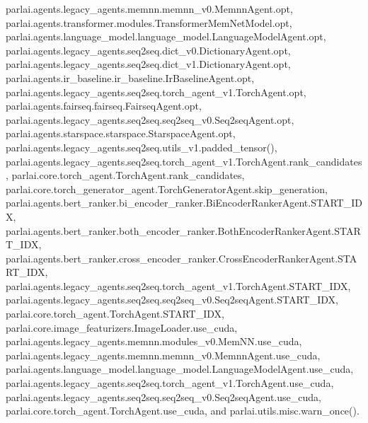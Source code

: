 parlai.\+agents.\+legacy\+\_\+agents.\+memnn.\+memnn\+\_\+v0.\+Memnn\+Agent.\+opt, parlai.\+agents.\+transformer.\+modules.\+Transformer\+Mem\+Net\+Model.\+opt, parlai.\+agents.\+language\+\_\+model.\+language\+\_\+model.\+Language\+Model\+Agent.\+opt, parlai.\+agents.\+legacy\+\_\+agents.\+seq2seq.\+dict\+\_\+v0.\+Dictionary\+Agent.\+opt, parlai.\+agents.\+legacy\+\_\+agents.\+seq2seq.\+dict\+\_\+v1.\+Dictionary\+Agent.\+opt, parlai.\+agents.\+ir\+\_\+baseline.\+ir\+\_\+baseline.\+Ir\+Baseline\+Agent.\+opt, parlai.\+agents.\+legacy\+\_\+agents.\+seq2seq.\+torch\+\_\+agent\+\_\+v1.\+Torch\+Agent.\+opt, parlai.\+agents.\+fairseq.\+fairseq.\+Fairseq\+Agent.\+opt, parlai.\+agents.\+legacy\+\_\+agents.\+seq2seq.\+seq2seq\+\_\+v0.\+Seq2seq\+Agent.\+opt, parlai.\+agents.\+starspace.\+starspace.\+Starspace\+Agent.\+opt, parlai.\+agents.\+legacy\+\_\+agents.\+seq2seq.\+utils\+\_\+v1.\+padded\+\_\+tensor(), parlai.\+agents.\+legacy\+\_\+agents.\+seq2seq.\+torch\+\_\+agent\+\_\+v1.\+Torch\+Agent.\+rank\+\_\+candidates, parlai.\+core.\+torch\+\_\+agent.\+Torch\+Agent.\+rank\+\_\+candidates, parlai.\+core.\+torch\+\_\+generator\+\_\+agent.\+Torch\+Generator\+Agent.\+skip\+\_\+generation, parlai.\+agents.\+bert\+\_\+ranker.\+bi\+\_\+encoder\+\_\+ranker.\+Bi\+Encoder\+Ranker\+Agent.\+S\+T\+A\+R\+T\+\_\+\+I\+DX, parlai.\+agents.\+bert\+\_\+ranker.\+both\+\_\+encoder\+\_\+ranker.\+Both\+Encoder\+Ranker\+Agent.\+S\+T\+A\+R\+T\+\_\+\+I\+DX, parlai.\+agents.\+bert\+\_\+ranker.\+cross\+\_\+encoder\+\_\+ranker.\+Cross\+Encoder\+Ranker\+Agent.\+S\+T\+A\+R\+T\+\_\+\+I\+DX, parlai.\+agents.\+legacy\+\_\+agents.\+seq2seq.\+torch\+\_\+agent\+\_\+v1.\+Torch\+Agent.\+S\+T\+A\+R\+T\+\_\+\+I\+DX, parlai.\+agents.\+legacy\+\_\+agents.\+seq2seq.\+seq2seq\+\_\+v0.\+Seq2seq\+Agent.\+S\+T\+A\+R\+T\+\_\+\+I\+DX, parlai.\+core.\+torch\+\_\+agent.\+Torch\+Agent.\+S\+T\+A\+R\+T\+\_\+\+I\+DX, parlai.\+core.\+image\+\_\+featurizers.\+Image\+Loader.\+use\+\_\+cuda, parlai.\+agents.\+legacy\+\_\+agents.\+memnn.\+modules\+\_\+v0.\+Mem\+N\+N.\+use\+\_\+cuda, parlai.\+agents.\+legacy\+\_\+agents.\+memnn.\+memnn\+\_\+v0.\+Memnn\+Agent.\+use\+\_\+cuda, parlai.\+agents.\+language\+\_\+model.\+language\+\_\+model.\+Language\+Model\+Agent.\+use\+\_\+cuda, parlai.\+agents.\+legacy\+\_\+agents.\+seq2seq.\+torch\+\_\+agent\+\_\+v1.\+Torch\+Agent.\+use\+\_\+cuda, parlai.\+agents.\+legacy\+\_\+agents.\+seq2seq.\+seq2seq\+\_\+v0.\+Seq2seq\+Agent.\+use\+\_\+cuda, parlai.\+core.\+torch\+\_\+agent.\+Torch\+Agent.\+use\+\_\+cuda, and parlai.\+utils.\+misc.\+warn\+\_\+once().




